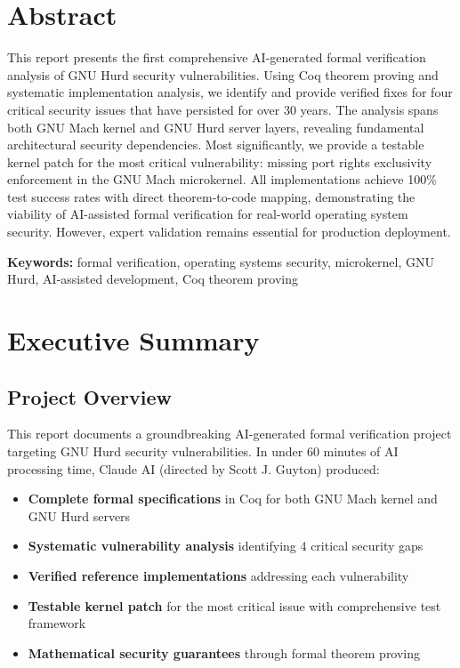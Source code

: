 \documentclass[11pt,a4paper]{article}
\begin{document}
\newpage
\section*{Abstract}

This report presents the first comprehensive AI-generated formal verification analysis of GNU Hurd security vulnerabilities. Using Coq theorem proving and systematic implementation analysis, we identify and provide verified fixes for four critical security issues that have persisted for over 30 years. The analysis spans both GNU Mach kernel and GNU Hurd server layers, revealing fundamental architectural security dependencies. Most significantly, we provide a testable kernel patch for the most critical vulnerability: missing port rights exclusivity enforcement in the GNU Mach microkernel. All implementations achieve 100\% test success rates with direct theorem-to-code mapping, demonstrating the viability of AI-assisted formal verification for real-world operating system security. However, expert validation remains essential for production deployment.

\textbf{Keywords:} formal verification, operating systems security, microkernel, GNU Hurd, AI-assisted development, Coq theorem proving

\newpage
\tableofcontents

\newpage
\section{Executive Summary}

\subsection{Project Overview}

This report documents a groundbreaking AI-generated formal verification project targeting GNU Hurd security vulnerabilities. In under 60 minutes of AI processing time, Claude AI (directed by Scott J. Guyton) produced:

\begin{itemize}
    \item \textbf{Complete formal specifications} in Coq for both GNU Mach kernel and GNU Hurd servers
    \item \textbf{Systematic vulnerability analysis} identifying 4 critical security gaps
    \item \textbf{Verified reference implementations} addressing each vulnerability
    \item \textbf{Testable kernel patch} for the most critical issue with comprehensive test framework
    \item \textbf{Mathematical security guarantees} through formal theorem proving
\end{itemize}
\end{document}
